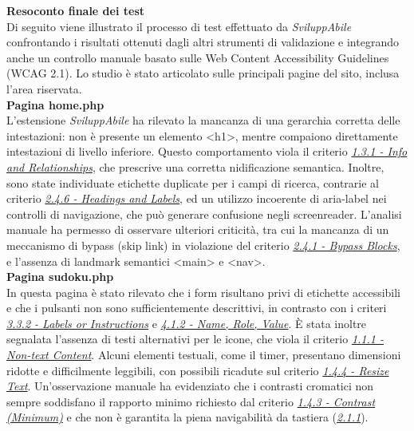 \vspace{0.8cm}

\noindent \textbf{Resoconto finale dei test}\\
\noindent Di seguito viene illustrato il processo di test effettuato da \textit{SviluppAbile} confrontando i risultati ottenuti dagli altri strumenti di validazione e integrando anche un controllo manuale basato sulle Web Content Accessibility Guidelines (WCAG 2.1). Lo studio è stato articolato sulle principali pagine del sito, inclusa l’area riservata.\\

\noindent \textbf{Pagina home.php}\\
L’estensione \textit{SviluppAbile} ha rilevato la mancanza di una gerarchia corretta delle intestazioni: non è presente un elemento <h1>, mentre compaiono direttamente intestazioni di livello inferiore. Questo comportamento viola il criterio {\hyperref[wcag:1.3.1]{\textit{1.3.1 - Info and Relationships}}}, che prescrive una corretta nidificazione semantica. Inoltre, sono state individuate etichette duplicate per i campi di ricerca, contrarie al criterio {\hyperref[wcag:2.4.6]{\textit{2.4.6 - Headings and Labels}}}, ed un utilizzo incoerente di aria-label nei controlli di navigazione, che può generare confusione negli screenreader.
L’analisi manuale ha permesso di osservare ulteriori criticità, tra cui la mancanza di un meccanismo di bypass (skip link) in violazione del criterio {\hyperref[wcag:2.4.1]{\textit{2.4.1 - Bypass Blocks}}}, e l’assenza di landmark semantici <main> e <nav>.\\

\noindent \textbf{Pagina sudoku.php}\\
In questa pagina è stato rilevato che i form risultano privi di etichette accessibili e che i pulsanti non sono sufficientemente descrittivi, in contrasto con i criteri {\hyperref[wcag:3.3.2]{\textit{3.3.2 - Labels or Instructions}}} e {\hyperref[wcag:4.1.2]{\textit{4.1.2 - Name, Role, Value}}}. È stata inoltre segnalata l’assenza di testi alternativi per le icone, che viola il criterio {\hyperref[wcag:1.1.1]{\textit{1.1.1 - Non-text Content}}}. Alcuni elementi testuali, come il timer, presentano dimensioni ridotte e difficilmente leggibili, con possibili ricadute sul criterio {\hyperref[wcag:1.4.4]{\textit{1.4.4 - Resize Text}}}.
Un’osservazione manuale ha evidenziato che i contrasti cromatici non sempre soddisfano il rapporto minimo richiesto dal criterio {\hyperref[wcag:1.4.3]{\textit{1.4.3 - Contrast (Minimum)}}} e che non è garantita la piena navigabilità da tastiera ({\hyperref[wcag:2.1.1]{\textit{2.1.1}}}).\\

